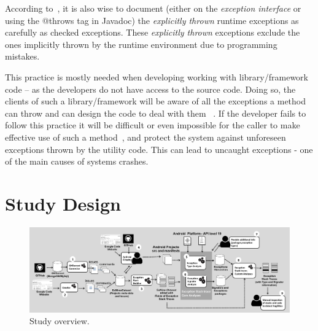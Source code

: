 \documentclass[conference]{IEEEtran}
\begin{document}
According to~\cite{bloch2008effective}, it is
also wise to document (either on the \emph{exception interface} or using the @throws tag in Javadoc) 
the \emph{explicitly thrown} runtime exceptions as carefully as checked exceptions. 
These \emph{explicitly thrown} exceptions exclude the ones implicitly 
thrown by the runtime environment due to programming
mistakes. 

This practice is mostly needed when developing  working with library/framework 
code -- as the developers do not have access to the source code. 
Doing so, the clients of such a library/framework
will be aware of all the exceptions a method can throw and can design the code
to deal with them ~\cite{Robil00}. If the developer fails to follow this practice 
 it will be difficult or even impossible for the caller to 
make effective use of such a method~\cite{wirfs2006toward, bloch2008effective},
and protect the system against unforeseen exceptions thrown by the utility code. 
This can lead to uncaught exceptions - one of the main causes of 
systems crashes. 

\section{Study Design}
\label{sec:study}


\begin{figure} \centering \includegraphics[scale=0.3]{studyoverview3.png}
\caption{Study overview.} \label{fig:overview} \end{figure}

\end{document}
